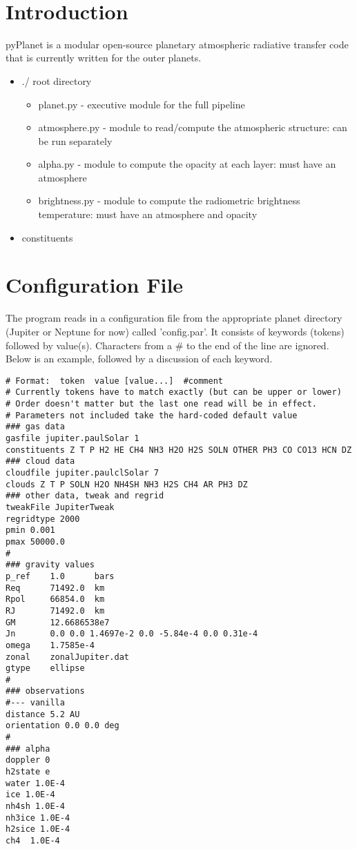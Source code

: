 \documentclass[11pt]{article}
\begin{document}
{ \\}
\vspace*{0.5cm}

\section{Introduction} 
pyPlanet is a modular open-source planetary atmospheric radiative transfer code that is currently written for the outer planets.  

\begin{itemize}
\item ./ root directory 
	\begin{itemize}
	\item planet.py - executive module for the full pipeline
	\item atmosphere.py - module to read/compute the atmospheric structure: can be run separately
	\item alpha.py - module to compute the opacity at each layer:  must have an atmosphere
	\item brightness.py - module to compute the radiometric brightness temperature:  must have an atmosphere and opacity
	\end{itemize}
\item constituents
\end{itemize}

\section{Configuration File}
The program reads in a configuration file from the appropriate planet directory (Jupiter or Neptune for now) called 'config.par'.  It consists of keywords (tokens) followed by value(s).  Characters from a \# to the end of the line are ignored.
Below is an example, followed by a discussion of each keyword.

\begin{verbatim}
# Format:  token  value [value...]  #comment
# Currently tokens have to match exactly (but can be upper or lower)
# Order doesn't matter but the last one read will be in effect.  
# Parameters not included take the hard-coded default value
### gas data
gasfile jupiter.paulSolar 1
constituents Z T P H2 HE CH4 NH3 H2O H2S SOLN OTHER PH3 CO CO13 HCN DZ
### cloud data
cloudfile jupiter.paulclSolar 7
clouds Z T P SOLN H2O NH4SH NH3 H2S CH4 AR PH3 DZ
### other data, tweak and regrid
tweakFile JupiterTweak
regridtype 2000
pmin 0.001
pmax 50000.0
#
### gravity values
p_ref    1.0      bars
Req      71492.0  km
Rpol     66854.0  km
RJ       71492.0  km
GM       12.6686538e7
Jn       0.0 0.0 1.4697e-2 0.0 -5.84e-4 0.0 0.31e-4
omega    1.7585e-4
zonal    zonalJupiter.dat
gtype    ellipse
#
### observations
#--- vanilla
distance 5.2 AU
orientation 0.0 0.0 deg
#
### alpha
doppler 0
h2state e
water 1.0E-4
ice 1.0E-4
nh4sh 1.0E-4
nh3ice 1.0E-4
h2sice 1.0E-4
ch4  1.0E-4
\end{verbatim}
\end{document}
